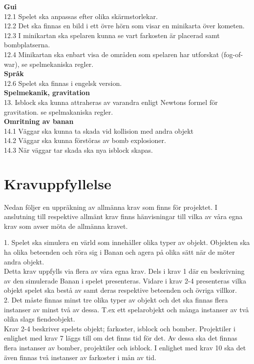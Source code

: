 \documentclass{TDP005mall}
\begin{document}
\textbf{Gui}\\
12.1 Spelet ska anpassas efter olika skärmstorlekar.\\
12.2 Det ska finnas en bild i ett övre hörn som visar en minikarta över kometen.\\
12.3 I minikartan ska spelaren kunna se vart farkosten är placerad samt
bombplatserna.\\
12.4 Minikartan ska enbart visa de områden som spelaren har utforskat
(fog-of-war), se spelmekaniska regler.\\

\textbf{Språk}\\
12.6 Spelet ska finnas i engelsk version.\\

\textbf{Spelmekanik, gravitation}\\
13. Isblock ska kunna attraheras av varandra enligt  Newtons formel för
gravitation. se spelmakaniska regler.\\

\textbf{Omritning av banan}\\
14.1 Väggar ska kunna ta skada vid kollision med andra objekt\\
14.2 Väggar ska kunna förstöras av bomb explosioner. \\
14.3 När väggar tar skada ska nya isblock skapas. \\
\pagebreak 

\section{Kravuppfyllelse}
Nedan följer en uppräkning av allmänna krav som finns för projektet. I anslutning till respektive allmänt krav finns hänvisningar till vilka av våra egna krav som avser möta de allmänna kravet.

1. Spelet ska simulera en värld som innehåller olika typer av objekt. Objekten ska ha olika beteenden och röra sig i Banan och agera på olika sätt när de möter andra objekt.\\
Detta krav uppfylls via flera av våra egna krav. Dels i krav 1 där en beskrivning av den simulerade Banan i spelet presenteras. Vidare i krav 2-4 presenteras vilka objekt spelet ska bestå av samt deras respektive beteenden och övriga villkor.\\

2. Det måste finnas minst tre olika typer av objekt och det ska finnas flera instanser av minst två av dessa. T.ex ett spelarobjekt och många instanser av två olika slags fiendeobjekt.\\
Krav 2-4 beskriver spelets objekt; farkoster, isblock och bomber. Projektiler i enlighet med krav 7 läggs till om det finns tid för det. Av dessa ska det finnas flera instanser av bomber, projektiler och isblock. I enlighet med krav 10  ska det även finnas två instanser av farkoster i mån av tid.\\
\end{document}
